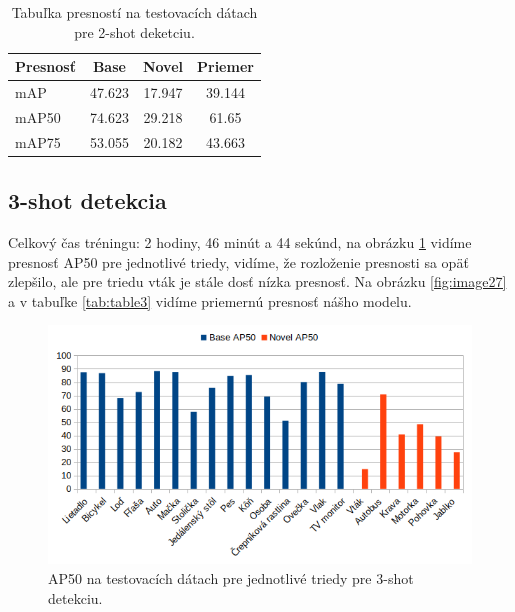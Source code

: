\begin{table}[H]
\begin{tabular}{|l|c|c|c|}
\hline
\textbf{Presnosť} & \textbf{Base} & \textbf{Novel} & \textbf{Priemer} \\
\hline
mAP & 47.623 & 17.947 & 39.144 \\
mAP50 & 74.623 & 29.218 & 61.65 \\
mAP75 & 53.055 & 20.182 & 43.663 \\
\hline
\end{tabular}
\centering
\caption{Tabuľka presností na testovacích dátach pre 2-shot deketciu.}
\label{tab:table2}
\end{table}

\subsection{3-shot detekcia}

Celkový čas tréningu: 2 hodiny, 46 minút a 44 sekúnd, na obrázku \ref{fig:image25} vidíme presnosť AP50 pre jednotlivé triedy, vidíme, že rozloženie presnosti sa opäť zlepšilo, ale pre triedu vták je stále dosť nízka presnosť. Na obrázku \ref{fig:image27} a v tabuľke \ref{tab:table3} vidíme priemernú presnosť nášho modelu.

\begin{figure}[H]
\includegraphics[width=\textwidth]{images/3_shot_classes_AP50.png}
\centering
\caption{AP50 na testovacích dátach pre jednotlivé triedy pre 3-shot detekciu.}
\label{fig:image25}
\end{figure}

